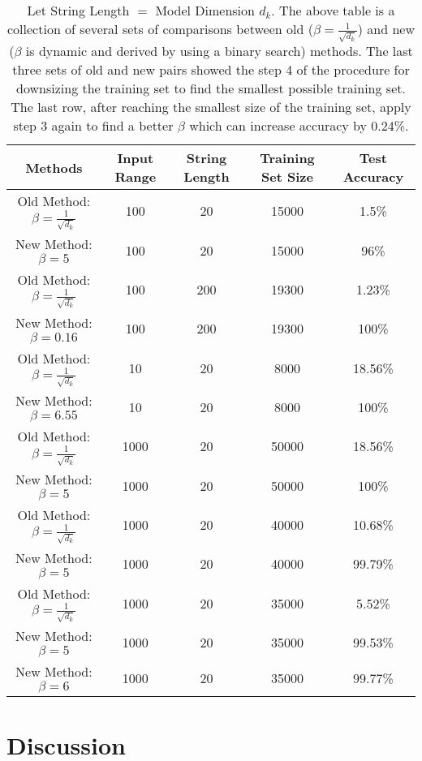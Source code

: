 \documentclass{article}
\theoremstyle{plain}
\theoremstyle{plain} %
\theoremstyle{definition}  %
\theoremstyle{remark}  %
\theoremstyle{plain}
\begin{document}
\begin{table}[H]
\begin{center}
\begin{tabular}{||c c c c c||} 
 \hline
 Methods & Input Range & String Length & Training Set Size & Test Accuracy \\ [0.5ex] 
 \hline\hline
 Old Method: $\beta=\frac{1}{\sqrt{d_k}}$  & 100 & 20 & 15000 & 1.5\% \\ 
 New Method: $\beta=5$  & 100 & 20 & 15000 & 96\% \\
 \hline
 Old Method: $\beta=\frac{1}{\sqrt{d_k}}$  & 100 & 200 & 19300 & 1.23\%\\
 New Method: $\beta=0.16$  & 100 & 200 & 19300 &  100\%\\
 \hline
 Old Method: $\beta=\frac{1}{\sqrt{d_k}}$  & 10 & 20 & 8000 &  18.56\%\\ 
 New Method: $\beta=6.55$  & 10 & 20 & 8000 &  100\%\\
 \hline
 Old Method: $\beta=\frac{1}{\sqrt{d_k}}$  & 1000 & 20 & 50000 &  18.56\%\\ 
 New Method: $\beta=5$  & 1000 & 20 & 50000 &  100\%\\
 \hline
 Old Method: $\beta=\frac{1}{\sqrt{d_k}}$  & 1000 & 20 & 40000 &  10.68\%\\ 
 New Method: $\beta=5$  & 1000 & 20 & 40000 &  99.79\%\\
 \hline
 Old Method: $\beta=\frac{1}{\sqrt{d_k}}$  & 1000 & 20 & 35000 &  5.52\%\\ 
 New Method: $\beta=5$  & 1000 & 20 & 35000 &  99.53\%\\
 New Method: $\beta=6$  & 1000 & 20 & 35000 &  99.77\%\\ [1ex] 
 \hline
 

 \hline
\end{tabular}
\caption{Let String Length $=$ Model Dimension $d_k$.  The above table is a collection of several sets of comparisons between old ($\beta=\frac{1}{\sqrt{d_k}}$) and new ($\beta$ is dynamic and derived by using a binary search) methods. The last three sets of old and new pairs showed the step 4 of the procedure for downsizing the training set to find the smallest possible training set. The last row, after reaching the smallest size of the training set, apply step 3 again to find a better $\beta$ which can increase accuracy by 0.24\%.}
\end{center}
\end{table}
\section{Discussion}
\end{document}
